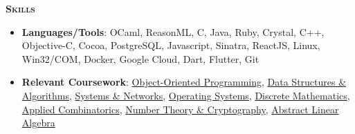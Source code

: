 \documentclass{article}
\newcommand{\sectionHeader}[1]{{\large \textbf{\textsc{#1}}}\hspace{5pt}\xrfill[.5ex]{.4pt}}
\begin{document}
  \vspace{8pt}

  \sectionHeader{Skills}
  \begin{itemize}
    \item \textbf{Languages/Tools}: OCaml, ReasonML, C, Java, Ruby, Crystal, C++, Objective-C, Cocoa, PostgreSQL, Javascript, Sinatra, ReactJS, Linux, Win32/COM, Docker, Google Cloud, Dart, Flutter, Git
    \item \textbf{Relevant Coursework}: \href{http://www.catalog.gatech.edu/search/?P=CS%201331}{Object-Oriented Programming}, \href{http://www.catalog.gatech.edu/search/?P=CS%201332}{Data Structures \& Algorithms}, \href{http://www.catalog.gatech.edu/search/?P=CS%202200}{Systems \& Networks}, \href{http://www.catalog.gatech.edu/search/?P=CS%203210}{Operating Systems}, \href{http://www.catalog.gatech.edu/search/?P=CS%202050}{Discrete Mathematics}, \href{https://people.math.gatech.edu/~trotter/math-3012/toppage.html}{Applied Combinatorics}, \href{https://math.gatech.edu/courses/math/4803-hp}{Number Theory \& Cryptography}, \href{https://math.gatech.edu/courses/math/3406}{Abstract Linear Algebra}
  \end{itemize}
\end{document}
